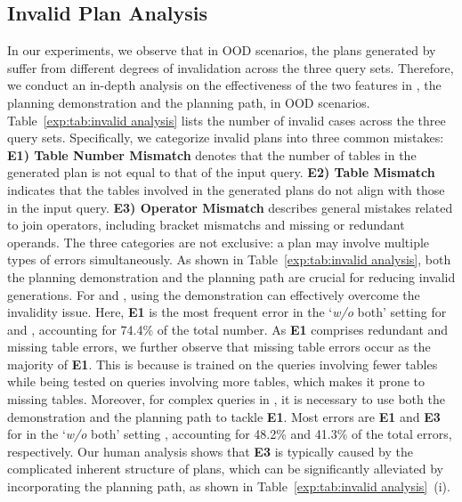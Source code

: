 \subsection{Invalid Plan Analysis}
\label{sec:exp:validity_analysis}
In our experiments, we observe that in OOD scenarios, the plans generated by \LLMQO suffer from different degrees of invalidation across the three query sets.
Therefore, we conduct an in-depth analysis on the effectiveness of the two features in  \QueryInstruct, the planning demonstration and the planning path, in OOD scenarios. 
Table~\ref{exp:tab:invalid analysis} lists the number of invalid cases across the three query sets. 
Specifically, we categorize invalid plans into three common mistakes:
{\textbf{E1) Table Number Mismatch}} denotes that the number of tables in the generated plan is not equal to that of the input query.
{\textbf{E2) Table Mismatch}} indicates that the tables involved in the generated plans do not align with those in the input query. 
{\textbf{E3) Operator Mismatch}} describes general mistakes related to join operators, including bracket mismatchs and missing or redundant operands.
The three categories are not exclusive: a plan may involve multiple types of errors simultaneously.
As shown in Table~\ref{exp:tab:invalid analysis}, both the planning demonstration and the planning path are crucial for reducing invalid generations. 
For \imdb  and \job, using the demonstration can effectively overcome the invalidity issue.
Here, \textbf{E1} is the most frequent error in the `\textit{w/o} both' setting for \imdb and \job, accounting for 74.4\% of the total number. 
As \textbf{E1} comprises redundant and missing table errors, we further observe that missing table errors occur as the majority of \textbf{E1}.
This is because \LLMQO is trained on the queries involving fewer tables while being tested on queries involving more tables, which makes it prone to missing tables.  
Moreover, for complex queries in \dsb, it is necessary to use both the demonstration and the planning path to tackle \textbf{E1}. 
Most errors are \textbf{E1} and \textbf{E3} for \dsb in the `\textit{w/o} both' setting , accounting for 48.2\% and 41.3\% of the total errors, respectively.
Our human analysis shows that \textbf{E3} is typically caused by the complicated inherent structure of plans, which can be significantly alleviated by incorporating the planning path, as shown in Table~\ref{exp:tab:invalid analysis}~(i).

